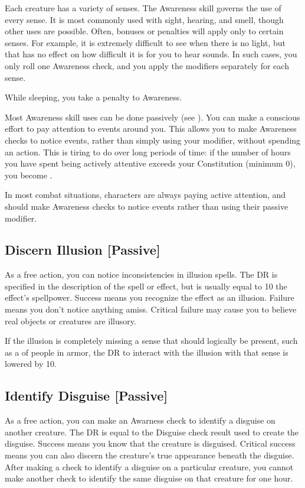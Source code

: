     Each creature has a variety of senses. The Awareness skill governs the use of every sense. It is most commonly used with sight, hearing, and smell, though other uses are possible. Often, bonuses or penalties will apply only to certain senses. For example, it is extremely difficult to see when there is no light, but that has no effect on how difficult it is for you to hear sounds. In such cases, you only roll one Awareness check, and you apply the modifiers separately for each sense.

    While sleeping, you take a  penalty to Awareness.

    \label{Awareness-Passive and Active Attention}
    Most Awareness skill uses can be done passively (see ).
    You can make a conscious effort to pay attention to events around you. This allows you to make Awareness checks to notice events, rather than simply using your modifier, without spending an action. This is tiring to do over long periods of time: if the number of hours you have spent being actively attentive exceeds your Constitution (minimum 0), you become \fatigued.

        In most combat situations, characters are always paying active attention, and should make Awareness checks to notice events rather than using their passive modifier.

    \subsection{Discern Illusion [Passive]}
        As a free action, you can notice inconsistencies in illusion spells. The DR is specified in the description of the spell or effect, but is usually equal to 10 \add the effect's spellpower. Success means you recognize the effect as an illusion. Failure means you don't notice anything amiss. Critical failure may cause you to believe real objects or creatures are illusory.

        If the illusion is completely missing a sense that should logically be present, such as a  of people in armor, the DR to interact with the illusion with that sense is lowered by 10.

    \subsection{Identify Disguise [Passive]}
        As a free action, you can make an Awarness check to identify a disguise on another creature. The DR is equal to the Disguise check result used to create the disguise. Success means you know that the creature is disguised. Critical success means you can also discern the creature's true appearance beneath the disguise. After making a check to identify a disguise on a particular creature, you cannot make another check to identify the same disguise on that creature for one hour.

